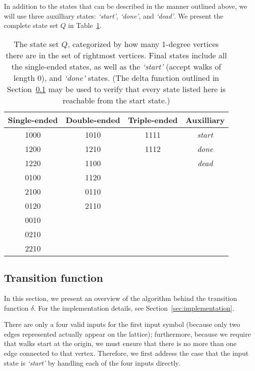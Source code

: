 In addition to the states that can be described in the manner outlined above, we will use three auxilliary states: \emph{`start'}, \emph{`done'}, and \emph{`dead'}. We present the complete state set $Q$ in Table~\ref{tab:states}.

\begin{table}
\begin{center}
\begin{tabular}{cccc}
\hline
Single-ended & Double-ended & Triple-ended & Auxilliary \\
\hline
1000 & 1010 & 1111 & \emph{start} \\
1200 & 1210 & 1112 & \emph{done} \\
1220 & 1100 &  & \emph{dead} \\
0100 & 1120 &  &  \\
2100 & 0110 &  &  \\
0120 & 2110 &  &  \\
0010 &  &  &  \\
0210 &  &  &  \\
2210 &  &  &  \\
\hline
\end{tabular}
\end{center}
\caption{The state set $Q$, categorized by how many 1-degree vertices there are in the set of rightmost vertices. Final states include all the single-ended states, as well as the \emph{`start'} (accept walks of length 0), and \emph{`done'} states. (The delta function outlined in Section~\ref{sec:overview-delta} may be used to verify that every state listed here is reachable from the start state.)}
\label{tab:states}
\end{table}

\subsection{Transition function}
\label{sec:overview-delta}

In this section, we present an overview of the algorithm behind the transition function $\delta$. For the implementation details, see Section~\ref{sec:implementation}.

There are only a four valid inputs for the first input symbol (because only two edges represented actually appear on the lattice); furthermore, because we require that walks start at the origin, we must ensure that there is no more than one edge connected to that vertex. Therefore, we first address the case that the input state is \emph{`start'} by handling each of the four inputs directly.

